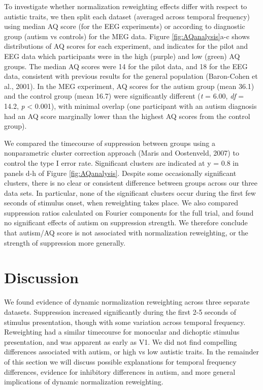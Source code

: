 \documentclass[
]{article}
\begin{document}
To investigate whether normalization reweighting effects differ with respect to autistic traits, we then split each dataset (averaged across temporal frequency) using median AQ score (for the EEG experiments) or according to diagnostic group (autism vs controls) for the MEG data. Figure \ref{fig:AQanalysis}a-c shows distributions of AQ scores for each experiment, and indicates for the pilot and EEG data which participants were in the high (purple) and low (green) AQ groups. The median AQ scores were 14 for the pilot data, and 18 for the EEG data, consistent with previous results for the general population (Baron-Cohen et al., 2001). In the MEG experiment, AQ scores for the autism group (mean 36.1) and the control group (mean 16.7) were significantly different (\emph{t} = 6.00, \emph{df} = 14.2, \emph{p} \textless{} 0.001), with minimal overlap (one participant with an autism diagnosis had an AQ score marginally lower than the highest AQ scores from the control group).

We compared the timecourse of suppression between groups using a nonparametric cluster correction approach (Maris and Oostenveld, 2007) to control the type I error rate. Significant clusters are indicated at y = 0.8 in panels d-h of Figure \ref{fig:AQanalysis}. Despite some occasionally significant clusters, there is no clear or consistent difference between groups across our three data sets. In particular, none of the significant clusters occur during the first few seconds of stimulus onset, when reweighting takes place. We also compared suppression ratios calculated on Fourier components for the full trial, and found no significant effects of autism on suppression strength. We therefore conclude that autism/AQ score is not associated with normalization reweighting, or the strength of suppression more generally.

\hypertarget{discussion}{%
\section{Discussion}\label{discussion}}

We found evidence of dynamic normalization reweighting across three separate datasets. Suppression increased significantly during the first 2-5 seconds of stimulus presentation, though with some variation across temporal frequency. Reweighting had a similar timecourse for monocular and dichoptic stimulus presentation, and was apparent as early as V1. We did not find compelling differences associated with autism, or high vs low autistic traits. In the remainder of this section we will discuss possible explanations for temporal frequency differences, evidence for inhibitory differences in autism, and more general implications of dynamic normalization reweighting.
\end{document}
